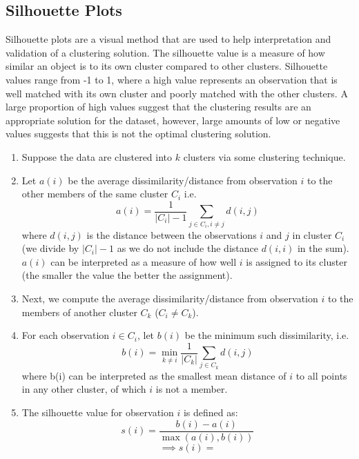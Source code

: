 \documentclass[]{article}
\begin{document}
\subsection{Silhouette Plots}
Silhouette plots are a visual method that are used to help interpretation and validation of a clustering solution. 
The silhouette value is a measure of how similar an object is to its own cluster compared to other clusters. Silhouette values range from -1 to 1, where a high value represents an observation that is well matched with its own cluster and poorly matched with the other clusters. A large proportion of high values suggest that the clustering results are an appropriate solution for the dataset, however, large amounts of low or negative values suggests that this is not the optimal clustering solution.  


\begin{enumerate}
	\item Suppose the data are clustered into $k$ clusters via some clustering technique. 
	\item Let $a(i)$ be the average dissimilarity/distance from observation $i$ to the other members of the same cluster $C_i$ i.e. 
		\begin{equation}
			a(i) = \frac{1}{|C_i| - 1} \sum_{j \in C_i, i \neq j} d(i, j)
		\end{equation}
		where $d(i, j)$ is the distance between the observations $i$ and $j$ in cluster $C_i$ (we divide by $|C_i| - 1$ as we do not include the distance $d(i, i)$ in the sum). $a(i)$ can be interpreted as a measure of how well $i$ is assigned to its cluster (the smaller the value the better the assignment).
	\item Next, we compute the average dissimilarity/distance from observation $i$ to the members of another cluster $C_k$ ($C_i \neq C_k$).
	\item For each observation $i \in C_i$, let $b(i)$ be the minimum such dissimilarity, i.e.
		\begin{equation}
			b(i) = \min_{k \neq i} \frac{1}{|C_k|}\sum_{j \in C_k} d(i, j)
		\end{equation}
		where b(i) can be interpreted as the smallest mean distance of $i$ to all points in any other cluster, of which $i$ is not a member. 
	\item The silhouette value for observation $i$ is defined as:
	\begin{equation}
		s(i) = \frac{b(i) - a(i)}{\max(a(i), b(i))}
	\end{equation}
\[ 
  \implies s(i) = 
\]
\end{enumerate}
\end{document}
